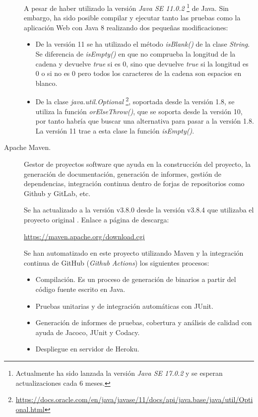 \begin{description}
		A pesar de haber utilizado la versión \textit{Java SE 11.0.2} \footnote{Actualmente ha sido lanzada la versión \textit{Java SE 17.0.2} y se esperan actualizaciones cada 6 meses.} de Java. Sin embargo, ha sido posible compilar y ejecutar tanto las pruebas como la aplicación Web con Java 8 realizando dos pequeñas modificaciones:
		\begin{itemize}
			\item De la versión 11 se ha utilizado el método \textit{isBlank()} de la clase \textit{String}. Se diferencia de \textit{isEmpty()} en que no comprueba la longitud de la cadena y devuelve \textit{true} si es 0, sino que devuelve \textit{true} si la longitud es 0 o si no es 0 pero todos los caracteres de la cadena son espacios en blanco.
			\item De la clase \textit{java.util.Optional} \footnote{\url{https://docs.oracle.com/en/java/javase/11/docs/api/java.base/java/util/Optional.html}}, soportada desde la versión 1.8, se utiliza la función \textit{orElseThrow()}, que se soporta desde la versión 10, por tanto habría que buscar una alternativa para pasar a la versión 1.8. La versión 11 trae a esta clase la función \textit{isEmpty()}.
		\end{itemize}
	\item[Apache Maven.] Gestor de proyectos software que ayuda en la construcción del proyecto, la generación de documentación, generación de informes, gestión de dependencias, integración continua dentro de forjas de repositorios como Github y GitLab, etc. 
	
		Se ha actualizado a la versión v3.8.0 desde la versión  v3.8.4 que utilizaba el proyecto original \cite{TFGPrevio}. Enlace a página de descarga:
		
		\url{https://maven.apache.org/download.cgi}
		
		Se han automatizado en este proyecto utilizando Maven y la integración continua de GitHub (\textit{Github Actions}) los siguientes procesos:
		\begin{itemize}
			\item Compilación. Es un proceso de generación de binarios a partir del código fuente escrito en Java.
			\item Pruebas unitarias y de integración automáticas con JUnit.
			\item Generación de informes de pruebas, cobertura y análisis de calidad con ayuda de Jacoco, JUnit y Codacy.
			\item Despliegue en servidor de Heroku.
		\end{itemize}
	

\end{description}
